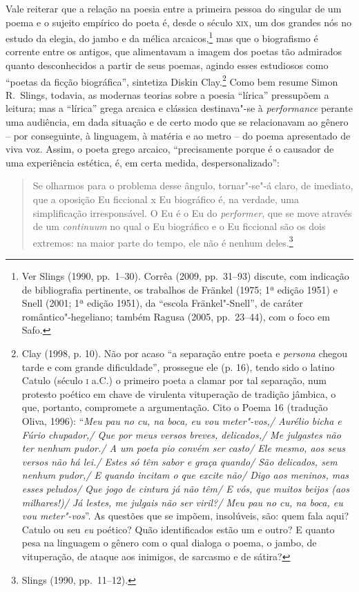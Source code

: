 Vale reiterar que a relação na poesia entre a primeira pessoa do
singular de um poema e o sujeito empírico do poeta é, desde o século \textsc{xix}, um
dos grandes nós no estudo da elegia, do jambo e da mélica arcaicos,\footnote{
Ver Slings (1990, pp.~1--30). Corrêa (2009, pp.~31--93) discute, com indicação de
bibliografia pertinente, os trabalhos de Fränkel (1975; 1ª edição
1951) e Snell (2001; 1ª edição 1951), da “escola Fränkel"-Snell”, de
caráter romântico"-hegeliano; também Ragusa (2005, pp.~23--44), com o foco em
Safo.} mas que o biografismo é corrente entre os antigos, que alimentavam a
imagem dos poetas tão admirados quanto desconhecidos a partir de seus poemas,
agindo esses estudiosos como “poetas da ficção biográfica”, sintetiza Diskin
Clay.\footnote{ Clay (1998, p. 10). Não por acaso “a separação entre poeta e
\textit{persona} chegou tarde e com grande dificuldade”, prossegue ele (p. 16),
tendo sido o latino Catulo (século \textsc{i} a.C.) o primeiro poeta a clamar por tal
separação, num protesto poético em chave de virulenta vituperação de tradição
jâmbica, o que, portanto, compromete a argumentação. Cito o Poema 16 (tradução
Oliva, 1996): ``\textit{Meu pau no cu, na boca, eu vou meter"-vos,/ Aurélio bicha
e Fúrio chupador,/ Que por meus versos breves, delicados,/ Me julgastes não
ter nenhum pudor./ A um poeta pio convém ser casto/ Ele mesmo, aos seus
versos não há lei./ Estes só têm sabor e graça quando/ São delicados, sem
nenhum pudor,/ E quando incitam o que excite não/ Digo aos meninos, mas esses
peludos/ Que jogo de cintura já não têm/ E vós, que muitos beijos (aos
milhares!)/ Já lestes, me julgais não ser viril?/ Meu pau no cu, na boca, eu
vou meter"-vos}''. As questões que se impõem, insolúveis, são: quem fala
aqui? Catulo ou seu \textit{eu} poético? Quão identificados estão um e outro? E quanto
pesa na linguagem o gênero com o qual dialoga o poema, o jambo, de vituperação,
de ataque aos inimigos, de sarcasmo e de sátira?} Como bem resume Simon R.~Slings, 
todavia, as modernas teorias sobre a poesia “lírica”
pressupõem a leitura; mas a “lírica” grega arcaica e clássica destinava"-se à
\textit{performance} perante uma audiência, em dada situação e de certo modo
que se relacionavam ao gênero -- por conseguinte, à linguagem, à matéria e ao
metro -- do poema apresentado de viva voz. Assim, o poeta grego arcaico,
“precisamente porque é o causador de uma experiência estética, é, em certa
medida, despersonalizado”:

\begin{quote}
Se olharmos para o problema desse ângulo, tornar"-se"-á claro, de imediato, que
a oposição Eu ficcional x Eu biográfico é, na verdade, uma simplificação
irresponsável. O Eu é o Eu do \textit{performer}, que se move através de um
\textit{continuum} no qual o Eu biográfico e o Eu ficcional são os dois
extremos: na maior parte do tempo, ele não é nenhum deles.\footnote{ Slings (1990, pp.~11--12).}
\end{quote}


